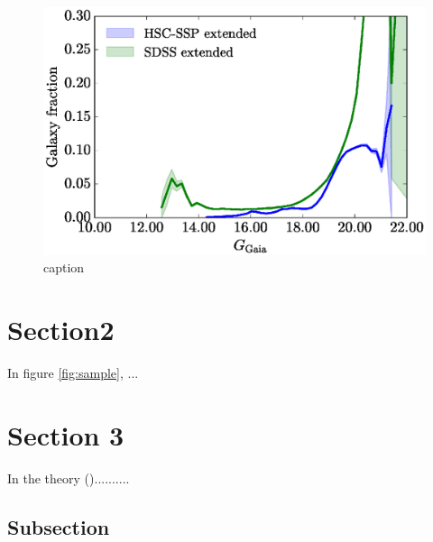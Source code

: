 \documentclass[]{pasj01}
\begin{document}
\begin{figure}
 \begin{center}
  \includegraphics[width=80cm]{galfrac.eps}
 \end{center}
 \caption{caption}\label{fig:test}
\end{figure}





\newpage

\section{Section2}

In figure \ref{fig:sample}, ...



\section{Section 3}

In the theory (\cite{key-1})..........

\subsection{Subsection}
\end{document}
